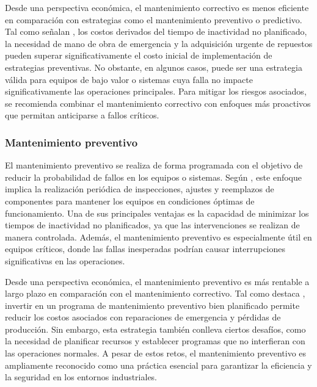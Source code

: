 Desde una perspectiva económica, el mantenimiento correctivo es menos eficiente en comparación con estrategias como el mantenimiento preventivo o predictivo. Tal como señalan \cite{Kelly2012}, los costos derivados del tiempo de inactividad no planificado, la necesidad de mano de obra de emergencia y la adquisición urgente de repuestos pueden superar significativamente el costo inicial de implementación de estrategias preventivas. No obstante, en algunos casos, puede ser una estrategia válida para equipos de bajo valor o sistemas cuya falla no impacte significativamente las operaciones principales. Para mitigar los riesgos asociados, se recomienda combinar el mantenimiento correctivo con enfoques más proactivos que permitan anticiparse a fallos críticos.

\subsubsection{Mantenimiento preventivo}

El mantenimiento preventivo se realiza de forma programada con el objetivo de reducir la probabilidad de fallos en los equipos o sistemas. Según \cite{Mobley2002}, este enfoque implica la realización periódica de inspecciones, ajustes y reemplazos de componentes para mantener los equipos en condiciones óptimas de funcionamiento. Una de sus principales ventajas es la capacidad de minimizar los tiempos de inactividad no planificados, ya que las intervenciones se realizan de manera controlada. Además, el mantenimiento preventivo es especialmente útil en equipos críticos, donde las fallas inesperadas podrían causar interrupciones significativas en las operaciones.

Desde una perspectiva económica, el mantenimiento preventivo es más rentable a largo plazo en comparación con el mantenimiento correctivo. Tal como destaca \cite{Wireman2004}, invertir en un programa de mantenimiento preventivo bien planificado permite reducir los costos asociados con reparaciones de emergencia y pérdidas de producción. Sin embargo, esta estrategia también conlleva ciertos desafíos, como la necesidad de planificar recursos y establecer programas que no interfieran con las operaciones normales. A pesar de estos retos, el mantenimiento preventivo es ampliamente reconocido como una práctica esencial para garantizar la eficiencia y la seguridad en los entornos industriales.

